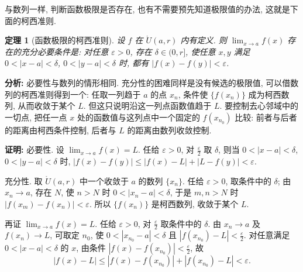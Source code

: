 \documentclass[UTF8,openany]{ctexbook}
\theoremstyle{chinesetextbook}
\newtheorem{theorem}{定理}[section]
\newenvironment{cnproof}{\par\indent\textbf{证明:} \ignorespaces}{\par}
\begin{document}
与数列一样, 判断函数极限是否存在, 也有不需要预先知道极限值的办法, 这就是下面的柯西准则.
\begin{theorem}[函数极限的柯西准则]
设 $f$ 在 $\mathring U(a,r)$ 内有定义. 则 $\displaystyle\lim_{x\to a}f(x)$ 存在的充分必要条件是: 对任意 $\varepsilon>0$, 存在 $\delta\in(0,r]$, 使任意 $x,y$ 满足 $0<|x-a|<\delta$, $0<|y-a|<\delta$ 时, 都有 $|f(x)-f(y)|<\varepsilon$.
\end{theorem}
\par\indent\textbf{分析:} 必要性与数列的情形相同. 充分性的困难同样是没有候选的极限值, 可以借数列的柯西准则得到一个: 任取一列趋于 $a$ 的点 $x_n$, 条件使 $\{f(x_n)\}$ 成为柯西数列, 从而收敛于某个 $L$. 但这只说明沿这一列点函数值趋于 $L$. 要控制去心邻域中的一切点, 把任一点 $x$ 处的函数值与这列点中一个固定的 $f(x_{n_0})$ 比较: 前者与后者的距离由柯西条件控制, 后者与 $L$ 的距离由数列收敛控制.
\begin{cnproof}
必要性. 设 $\displaystyle\lim_{x\to a}f(x)=L$. 任给 $\varepsilon>0$, 对 $\displaystyle\frac\varepsilon2$ 取 $\delta$, 则当 $0<|x-a|<\delta$, $0<|y-a|<\delta$ 时, $|f(x)-f(y)|\le|f(x)-L|+|L-f(y)|<\varepsilon$.

充分性. 取 $\mathring U(a,r)$ 中一个收敛于 $a$ 的数列 $\{x_n\}$. 任给 $\varepsilon>0$, 取条件中的 $\delta$; 由 $x_n\to a$, 存在 $N$, 使 $n>N$ 时 $0<|x_n-a|<\delta$, 于是 $m,n>N$ 时 $|f(x_m)-f(x_n)|<\varepsilon$. 所以 $\{f(x_n)\}$ 是柯西数列, 收敛于某个 $L$.

再证 $\displaystyle\lim_{x\to a}f(x)=L$. 任给 $\varepsilon>0$, 对 $\displaystyle\frac\varepsilon2$ 取条件中的 $\delta$. 由 $x_n\to a$ 及 $f(x_n)\to L$, 可取定 $n_0$, 使 $0<|x_{n_0}-a|<\delta$ 且 $\displaystyle|f(x_{n_0})-L|<\frac\varepsilon2$. 对任意满足 $0<|x-a|<\delta$ 的 $x$, 由条件 $\displaystyle|f(x)-f(x_{n_0})|<\frac\varepsilon2$, 故
\[
|f(x)-L|\le|f(x)-f(x_{n_0})|+|f(x_{n_0})-L|<\varepsilon.
\]
\end{cnproof}
\end{document}
